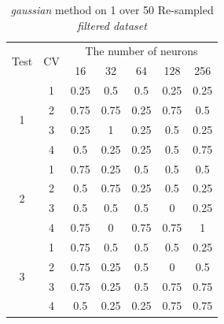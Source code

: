 \documentclass[draft,dvipsnames]{drexel-thesis}
\begin{document}
\begin{thesis}
\begin{table}[!t]
\centering
\caption{{\em gaussian} method on 1 over 50 Re-sampled {\em filtered dataset}}
\label{tbl:gaussian_1_50}
\begin{tabular}{|c|c|c|c|c|c|c|}
\hline
\multirow{2}{*}{Test} & \multirow{2}{*}{CV} & \multicolumn{5}{c|}{The number of neurons}                              \\ \cline{3-7}
                      &                     & 16           & 32           & 64           & 128         & 256          \\ \hline
\multirow{4}{*}{1}    & 1                   & 0.25         & 0.5          & 0.5          & 0.25        & 0.25         \\ \cline{2-7}
                      & 2                   & 0.75         & 0.75         & 0.25         & 0.75        & 0.5          \\ \cline{2-7}
                      & 3                   & 0.25         & 1            & 0.25         & 0.5         & 0.25         \\ \cline{2-7}
                      & 4                   & 0.5          & 0.25         & 0.25         & 0.5         & 0.75         \\ \hline
\multirow{4}{*}{2}    & 1                   & 0.75         & 0.25         & 0.5          & 0.5         & 0.5          \\ \cline{2-7}
                      & 2                   & 0.5          & 0.75         & 0.25         & 0.5         & 0.25         \\ \cline{2-7}
                      & 3                   & 0.5          & 0.5          & 0.5          & 0           & 0.25         \\ \cline{2-7}
                      & 4                   & 0.75         & 0            & 0.75         & 0.75        & 1            \\ \hline
\multirow{4}{*}{3}    & 1                   & 0.75         & 0.5          & 0.5          & 0.5         & 0.25         \\ \cline{2-7}
                      & 2                   & 0.75         & 0.25         & 0.5          & 0           & 0.5          \\ \cline{2-7}
                      & 3                   & 0.75         & 0.25         & 0.5          & 0.75        & 0.75         \\ \cline{2-7}
                      & 4                   & 0.5          & 0.25         & 0.25         & 0.75        & 0.75         \\ \hline

\end{tabular}
\end{table}
\end{thesis}
\end{document}
